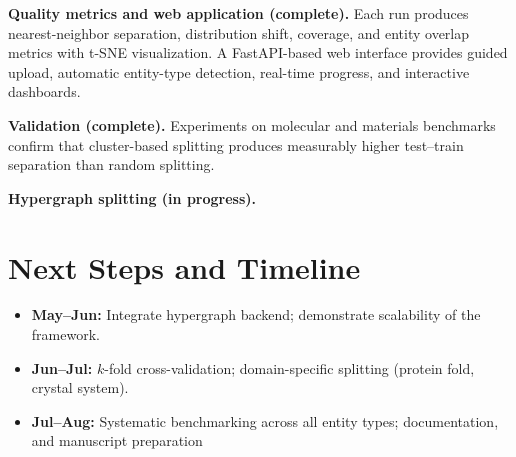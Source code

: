 \documentclass[11pt,oneside]{article}
\begin{document}
\textbf{Quality metrics and web application (complete).} Each run produces nearest-neighbor separation, distribution shift, coverage, and entity overlap metrics with t-SNE visualization. A FastAPI-based web interface provides guided upload, automatic entity-type detection, real-time progress, and interactive dashboards.

\textbf{Validation (complete).} Experiments on molecular and materials benchmarks~\cite{delaney2004esol,wu2018moleculenet,jain2013materialsproject} confirm that cluster-based splitting produces measurably higher test--train separation than random splitting.

\textbf{Hypergraph splitting (in progress).}

\section*{Next Steps and Timeline}

\begin{itemize}[nosep,leftmargin=1.5em]
    \item \textbf{May--Jun:} Integrate hypergraph backend; demonstrate scalability of the framework. 
    \item \textbf{Jun--Jul:} $k$-fold cross-validation; domain-specific splitting (protein fold, crystal system).
    \item \textbf{Jul--Aug:} Systematic benchmarking across all entity types; documentation, and manuscript preparation
\end{itemize}

\newpage

\end{document}
